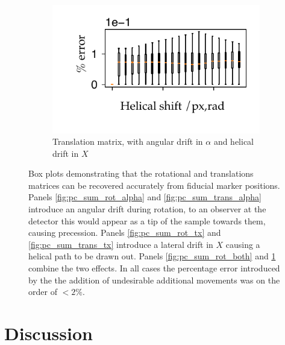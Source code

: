 \begin{figure}
\begin{subfigure}[t]{0.5\textwidth}
          \includegraphics{Chapters/flopt/Figs/PDF/results/helix/decompose/pc_sum_trans_both}
          \caption{Translation matrix, with angular drift in $\alpha$ and helical drift in \(X\)}\label{fig:pc_sum_trans_both}
        \end{subfigure}
          \caption{Box plots demonstrating that the rotational and translations matrices can be recovered accurately from fiducial marker positions.
          Panels \ref{fig:pc_sum_rot_alpha} and \ref{fig:pc_sum_trans_alpha} introduce an angular drift during rotation, to an observer at the detector this would appear as a tip of the sample towards them, causing precession.
          Panels \ref{fig:pc_sum_rot_tx} and \ref{fig:pc_sum_trans_tx} introduce a lateral drift in \(X\) causing a helical path to be drawn out.
          Panels \ref{fig:pc_sum_rot_both} and \ref{fig:pc_sum_trans_both} combine the two effects.
          In all cases the percentage error introduced by the the addition of undesirable additional movements was on the order of $<2\%$.
          }
          \label{fig:pc_sum_decompose}
\end{figure}

\section{Discussion}

